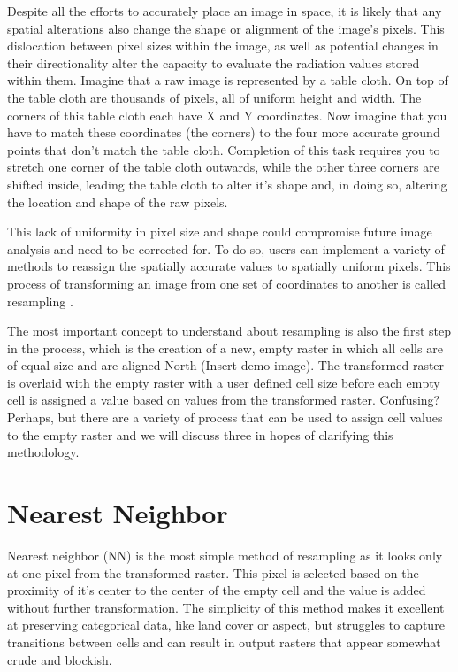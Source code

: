 \documentclass[
]{book}
\begin{document}
Despite all the efforts to accurately place an image in space, it is
likely that any spatial alterations also change the shape or alignment
of the image's pixels. This dislocation between pixel sizes within the
image, as well as potential changes in their directionality alter the
capacity to evaluate the radiation values stored within them. Imagine
that a raw image is represented by a table cloth. On top of the table
cloth are thousands of pixels, all of uniform height and width. The
corners of this table cloth each have X and Y coordinates. Now imagine
that you have to match these coordinates (the corners) to the four more
accurate ground points that don't match the table cloth. Completion of
this task requires you to stretch one corner of the table cloth
outwards, while the other three corners are shifted inside, leading the
table cloth to alter it's shape and, in doing so, altering the location
and shape of the raw pixels.

This lack of uniformity in pixel size and shape could compromise future
image analysis and need to be corrected for. To do so, users can
implement a variety of methods to reassign the spatially accurate values
to spatially uniform pixels. This process of transforming an image from
one set of coordinates to another is called resampling \citep{parker_comparison_1983}.

The most important concept to understand about resampling is also the
first step in the process, which is the creation of a new, empty raster
in which all cells are of equal size and are aligned North (Insert demo
image). The transformed raster is overlaid with the empty raster with a
user defined cell size before each empty cell is assigned a value based
on values from the transformed raster. Confusing? Perhaps, but there are
a variety of process that can be used to assign cell values to the empty
raster and we will discuss three in hopes of clarifying this
methodology.

\hypertarget{nearest-neighbor-1}{%
\section{Nearest Neighbor}\label{nearest-neighbor-1}}

Nearest neighbor (NN) is the most simple method of resampling as it
looks only at one pixel from the transformed raster. This pixel is
selected based on the proximity of it's center to the center of the
empty cell and the value is added without further transformation. The
simplicity of this method makes it excellent at preserving categorical
data, like land cover or aspect, but struggles to capture transitions
between cells and can result in output rasters that appear somewhat
crude and blockish.
\end{document}
